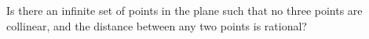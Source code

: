 Is there an infinite set of points in the plane such that no three points are collinear, and the distance between any two points is rational?